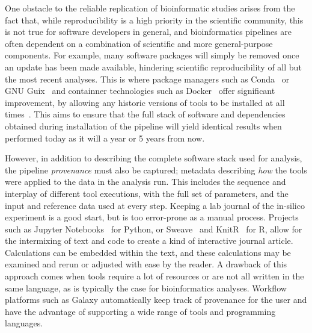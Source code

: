 \begin{justify}
One obstacle to the reliable replication of bioinformatic studies arises from the fact that, while reproducibility is a high priority in the scientific community, this is not true for software developers in general, and bioinformatics pipelines are often dependent on a combination of scientific and more general-purpose components. For example, many software packages will simply be removed once an update has been made available, hindering scientific reproducibility of all but the most recent analyses. This is where package managers such as Conda~\cite{conda} or GNU Guix~\cite{courtes2013functional} and containner technologies such as Docker~\cite{url-docker} offer significant improvement, by allowing any historic versions of tools to be installed at all times~\cite{kulkarni2018reproducible}. This aims to ensure that the full stack of software and dependencies obtained during installation of the pipeline will yield identical results when performed today as it will a year or 5 years from now.

However, in addition to describing the complete software stack used for analysis, the pipeline \emph{provenance} must also be captured; metadata describing \emph{how} the tools were applied to the data in the analysis run. This includes the sequence and interplay of different tool executions, with the full set of parameters, and the input and reference data used at every step. Keeping a lab journal of the in-silico experiment is a good start, but is too error-prone as a manual process. Projects such as Jupyter Notebooks~\cite{kluyver2016jupyter} for Python, or Sweave~\cite{leisch2002sweave} and KnitR~\cite{xie2014knitr} for R, allow for the intermixing of text and code to create a kind of interactive journal article. Calculations can be embedded within the text, and these calculations may be examined and rerun or adjusted with ease by the reader. A drawback of this approach comes when tools require a lot of resources or are not all written in the same language, as is typically the case for bioinformatics analyses. Workflow platforms such as Galaxy automatically keep track of provenance for the user and have the advantage of supporting a wide range of tools and programming languages.

\end{justify}
